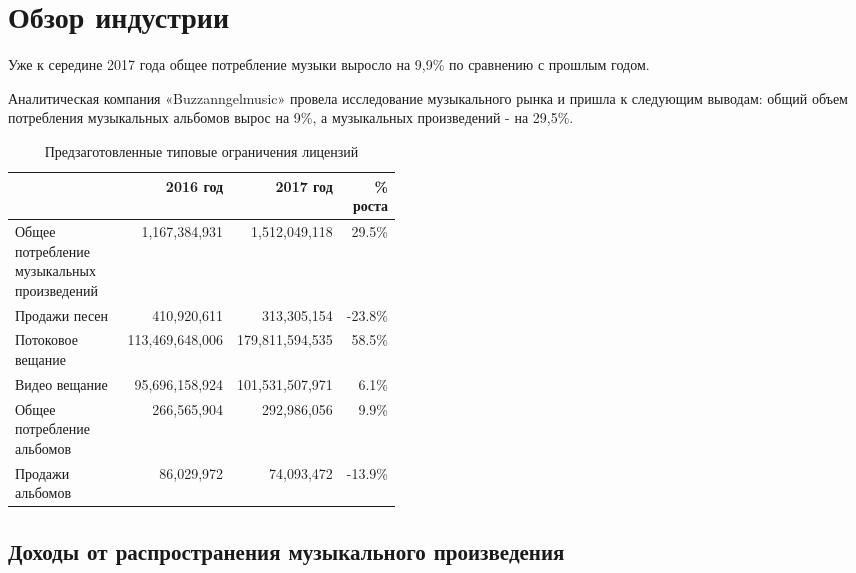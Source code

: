 \documentclass[12pt]{report}
\def\code#1{\colorbox{light-gray}{\texttt{#1}}}
\begin{document}
\chapter{Обзор индустрии}
\label{industry}
Уже к середине 2017 года общее потребление музыки выросло на 9,9\% по сравнению с прошлым годом. 

Аналитическая компания «Buzzanngelmusic» провела исследование музыкального рынка и пришла к следующим выводам: общий объем потребления музыкальных альбомов вырос на 9\%, а музыкальных произведений - на 29,5\%.  

\def\Prev{2016 год}
\def\Current{2017 год}
\def\Grow{\% роста}
\def\Summary{Общее потребление музыкальных произведений}
\def\Sales{Продажи песен}
\def\Streaming{Потоковое вещание}
\def\VideoStreaming{Видео вещание}
\def\Albums{Общее потребление альбомов}
\def\AlbumsSales{Продажи альбомов}
\def\TracksSales{Продажи песен}

\begin{table}[h]
\centering
\caption{Предзаготовленные типовые ограничения лицензий}
\begin{tabular}{p{0.45\linewidth}rrr}%
\toprule
& \Prev & \Current & \Grow \\
\bottomrule
\toprule
\midrule
\Summary 			& 1,167,384,931 		& 1,512,049,118 		& 29.5\% \\
\Sales 					& 410,920,611 			& 313,305,154 			& -23.8\% \\
\Streaming 			& 113,469,648,006 	& 179,811,594,535 	& 58.5\% \\
\VideoStreaming 	& 95,696,158,924 	& 101,531,507,971		& 6.1\% \\
\Albums 				& 266,565,904 		& 292,986,056 		& 9.9\% \\
\AlbumsSales 		& 86,029,972 			& 74,093,472	 		& -13.9\% \\
\bottomrule
\end{tabular}
\end{table}

\vfill\null\pagebreak
\section{Доходы от распространения музыкального произведения}
\label{industry-distribution}

\newcommand{\slice}[4]{
  \pgfmathparse{0.5*#1+0.5*#2}
  \let\midangle\pgfmathresult

  \draw[thick,fill=black!10] (0,0) -- (#1:1) arc (#1:#2:1) -- cycle;

  \node[label=\midangle:#4] at (\midangle:1) {};

  \pgfmathparse{min((#2-#1-10)/110*(-0.3),0)}
  \let\temp\pgfmathresult
  \pgfmathparse{max(\temp,-0.5) + 0.8}
  \let\innerpos\pgfmathresult
  \node at (\midangle:\innerpos) {#3};
}
\end{document}
